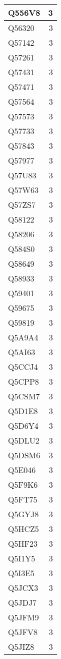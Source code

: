 \documentclass[
]{book}
\theoremstyle{definition}
\theoremstyle{definition}
\theoremstyle{definition}
\theoremstyle{definition}
\theoremstyle{remark}
\begin{document}
\begin{table}
\begin{tabular}{l|r}
\hline
Q556V8 & 3\\
\hline
Q56320 & 3\\
\hline
Q57142 & 3\\
\hline
Q57261 & 3\\
\hline
Q57431 & 3\\
\hline
Q57471 & 3\\
\hline
Q57564 & 3\\
\hline
Q57573 & 3\\
\hline
Q57733 & 3\\
\hline
Q57843 & 3\\
\hline
Q57977 & 3\\
\hline
Q57U83 & 3\\
\hline
Q57W63 & 3\\
\hline
Q57ZS7 & 3\\
\hline
Q58122 & 3\\
\hline
Q58206 & 3\\
\hline
Q584S0 & 3\\
\hline
Q58649 & 3\\
\hline
Q58933 & 3\\
\hline
Q59401 & 3\\
\hline
Q59675 & 3\\
\hline
Q59819 & 3\\
\hline
Q5A9A4 & 3\\
\hline
Q5AI63 & 3\\
\hline
Q5CCJ4 & 3\\
\hline
Q5CPP8 & 3\\
\hline
Q5CSM7 & 3\\
\hline
Q5D1E8 & 3\\
\hline
Q5D6Y4 & 3\\
\hline
Q5DLU2 & 3\\
\hline
Q5DSM6 & 3\\
\hline
Q5E046 & 3\\
\hline
Q5F9K6 & 3\\
\hline
Q5FT75 & 3\\
\hline
Q5GYJ8 & 3\\
\hline
Q5HCZ5 & 3\\
\hline
Q5HF23 & 3\\
\hline
Q5I1Y5 & 3\\
\hline
Q5I3E5 & 3\\
\hline
Q5JCX3 & 3\\
\hline
Q5JDJ7 & 3\\
\hline
Q5JFM9 & 3\\
\hline
Q5JFV8 & 3\\
\hline
Q5JIZ8 & 3\\

\end{tabular}
\end{table}
\end{document}
